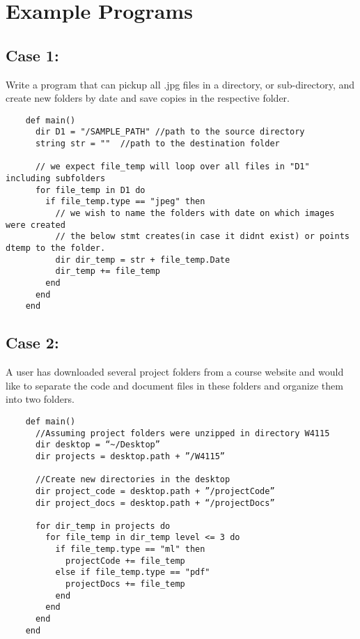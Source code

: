 \documentclass[11pt]{article}
\begin{document}
\newpage
\section{Example Programs}\label{results}
\subsection{Case 1:}
Write a program that can pickup all .jpg files in a directory, or sub-directory, and create new folders by date and save copies in the respective folder.
\begin{listing}[H]
  \begin{verbatim}
    def main()
      dir D1 = "/SAMPLE_PATH" //path to the source directory
      string str = ""  //path to the destination folder

      // we expect file_temp will loop over all files in "D1" including subfolders
      for file_temp in D1 do
        if file_temp.type == "jpeg" then
          // we wish to name the folders with date on which images were created
          // the below stmt creates(in case it didnt exist) or points dtemp to the folder.
          dir dir_temp = str + file_temp.Date
          dir_temp += file_temp
        end
      end
    end
  \end{verbatim}
\end{listing}

\subsection{Case 2:}
A user has downloaded several project folders from a course website and would like to separate the code and document files in these folders and organize them into two folders.
\begin{listing}[H]
  \begin{verbatim}
    def main()
      //Assuming project folders were unzipped in directory W4115
      dir desktop = “~/Desktop”
      dir projects = desktop.path + ”/W4115”

      //Create new directories in the desktop
      dir project_code = desktop.path + ”/projectCode”
      dir project_docs = desktop.path + “/projectDocs”

      for dir_temp in projects do
        for file_temp in dir_temp level <= 3 do
          if file_temp.type == "ml" then
            projectCode += file_temp
          else if file_temp.type == "pdf"
            projectDocs += file_temp
          end
        end
      end
    end
  \end{verbatim}
\end{listing}
\end{document}

